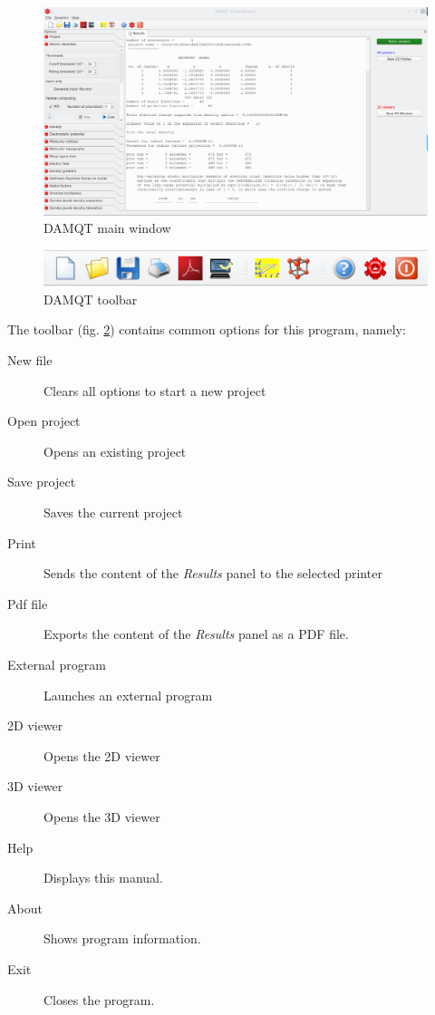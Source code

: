 \documentclass[10pt]{article}
\begin{document}
\vspace*{0cm}
\begin{figure}[H]
\begin{center}
\includegraphics[width=0.5\linewidth]{damqt320_main_panel.png}
\end{center}
\caption{{DAMQT} main window \label{fig:2_1}}
\end{figure}

\vspace*{0cm}
\begin{figure}[H]
\begin{center}
\includegraphics[width=0.5\linewidth]{damqt320_toolbar.png}
\end{center}
\caption{{DAMQT} toolbar \label{fig:2_2}}
\end{figure}

The toolbar (fig. \ref{fig:2_2}) contains common options for this
program, namely:


\begin{description}
 \item[\bigtoolbN New file] Clears all options to start a new project
 \item[\bigtoolbA Open project] Opens an existing  project
 \item[\bigtoolbS Save project] Saves the current project
 \item[\bigtoolbP Print] Sends the content of the {\it Results} panel to the selected printer
 \item[\bigtoolbD Pdf file] Exports the content of the {\it Results} panel as a PDF file.
 \item[\bigtoolbE External program] Launches an external program
 \item[\bigtoolbC 2D viewer] Opens the  2D viewer
 \item[\bigtoolbV 3D viewer] Opens the  3D viewer
 \item[\bigtoolbH Help] Displays this manual.
 \item[\bigtoolbB About] Shows program information.
 \item[\bigtoolbQ Exit] Closes the program.
\end{description} 
\end{document}

